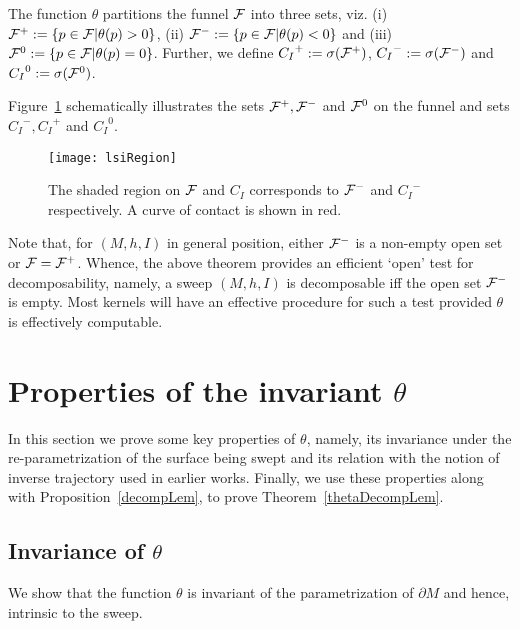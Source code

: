 \documentclass{elsart5p}
\begin{document}
\begin{defn}
The function $\theta$ partitions the funnel ${\cal F}$ into three sets, viz. 
(i) ${\cal F}^+ := \{ p \in {\cal F} | \theta (p) > 0 \}$, 
(ii) ${\cal F}^- := \{ p \in {\cal F} | \theta (p) < 0 \}$ and (iii) ${\cal F}^0 := \{ p \in {\cal F} | \theta (p) = 0 \}$.  
Further, we define ${C_I}^+ := \sigma({\cal F}^+)$, ${C_I}^- := \sigma ({\cal F}^-)$ and 
${C_I}^0 := \sigma ({\cal F}^0)$. 
\end{defn}

Figure~\ref{lsiRegionFig} schematically illustrates the sets ${\cal F}^+, {\cal F}^-$ and ${\cal F}^0$ on the funnel 
and sets ${C_I}^-, {C_I}^+$ and ${C_I}^0$.

\begin{figure}
 \centering
 \texttt{[image: lsiRegion]}
 \caption{The shaded region on ${\cal F}$ and $C_I$ corresponds to ${\cal F}^-$ and ${C_I}^-$ respectively.  A 
curve of contact is shown in red.}
 \label{lsiRegionFig}
\end{figure}

Note that, for $(M,h,I)$ in general position, 
either ${\cal F}^-$ is a non-empty open set or ${\cal F}={\cal F}^+$. 
Whence, the above theorem provides an efficient `open'
test for decomposability, namely, a sweep $(M,h,I)$
is decomposable iff the open set ${\cal F}^-$ is empty. Most kernels
will have an effective procedure for such a test provided $\theta$ is
effectively computable.

\section{Properties of the invariant $\theta$}  \label{thetaSec}

In this section we prove some key properties of $\theta$, namely, its 
invariance under the re-parametrization of the surface being swept and its relation with the notion of 
inverse trajectory used in earlier works. Finally, we use these properties along
with Proposition~\ref{decompLem}, to
prove Theorem~\ref{thetaDecompLem}.


\subsection{Invariance of $\theta$} \label{thetaInvarSec}
We show that the function $\theta$ is invariant of the parametrization of $\partial M$ and hence, intrinsic to the sweep. 
\end{document}
